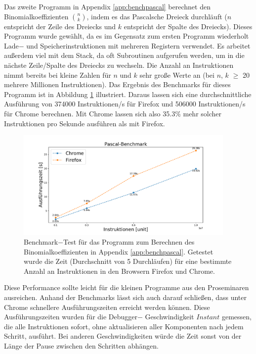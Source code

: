 \documentclass[a4paper, 11pt, onecolumn]{article}
\begin{document}
Das zweite Programm in Appendix \ref{app:benchpascal} berechnet den Binomialkoeffizienten ${n}\choose{k}$, indem es das Pascalsche Dreieck durchläuft ($n$ entspricht der Zeile des Dreiecks und $k$ entspricht der Spalte des Dreiecks). Dieses Programm wurde gewählt, da es im Gegensatz zum ersten Programm wiederholt Lade$-$ und Speicherinstruktionen mit mehreren Registern verwendet. Es arbeitet außerdem viel mit dem Stack, da oft Subroutinen aufgerufen werden, um in die nächste Zeile/Spalte des Dreiecks zu wechseln. Die Anzahl an Instruktionen nimmt bereits bei kleine Zahlen für $n$ und $k$ sehr große Werte an (bei $n$, $k$ $\geq$ 20 mehrere Millionen Instruktionen). Das Ergebnis des Benchmarks für dieses Programm ist in Abbildung \ref{fig:benchmarkPascal} illustriert. Daraus lassen sich eine durchschnittliche Ausführung von 374000 Instruktionen/s für Firefox und 506000 Instruktionen/s für Chrome berechnen. Mit Chrome lassen sich also 35.3\% mehr solcher Instruktionen pro Sekunde ausführen als mit Firefox.

\begin{figure}[!htb]
    \centering  
    \includegraphics[width=0.95\textwidth]{data/pascalBenchmark}
    \caption[Benchmark für Programm zum Berechnen des Binomialkoeffizienten]{Benchmark$-$Test für das Programm zum Berechnen des Binomialkoeffizienten in Appendix \ref{app:benchpascal}. Getestet wurde die Zeit (Durchschnitt von 5 Durchläufen) für eine bestimmte Anzahl an Instruktionen in den Browsern Firefox und Chrome.}
    \label{fig:benchmarkPascal}
\end{figure}

Diese Performance sollte leicht für die kleinen Programme aus den Proseminaren ausreichen. Anhand der Benchmarks lässt sich auch darauf schließen, dass unter Chrome schnellere Ausführungszeiten erreicht werden können. Diese Ausführungszeiten wurden für die Debugger$-$
Geschwindigkeit $Instant$ gemessen, die alle Instruktionen sofort, ohne aktualisieren aller Komponenten nach jedem Schritt, ausführt. Bei anderen Geschwindigkeiten würde die Zeit sonst von der Länge der Pause zwischen den Schritten abhängen.
\end{document}
